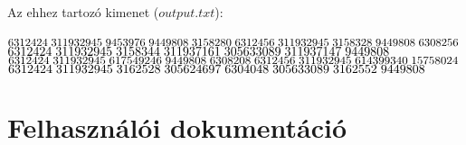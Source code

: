 \documentclass[12pt]{article}
\begin{document}
Az ehhez tartozó kimenet ($output.txt$):\\\\
$6312424\hspace{1mm} 311932945\hspace{1mm} 9453976\hspace{1mm} 9449808\hspace{1mm} 3158280\hspace{1mm} 6312456\hspace{1mm} 311932945\hspace{1mm} 3158328\hspace{1mm} 9449808\hspace{1mm} 6308256\hspace{1mm}$\\
$6312424\hspace{1mm} 311932945\hspace{1mm} 3158344\hspace{1mm} 311937161\hspace{1mm} 305633089\hspace{1mm} 311937147\hspace{1mm} 9449808\hspace{1mm}$\\
$6312424\hspace{1mm} 311932945\hspace{1mm} 617549246\hspace{1mm} 9449808\hspace{1mm} 6308208\hspace{1mm} 6312456\hspace{1mm} 311932945\hspace{1mm} 614399340\hspace{1mm} 15758024\hspace{1mm}$\\
$6312424\hspace{1mm} 311932945\hspace{1mm} 3162528\hspace{1mm} 305624697\hspace{1mm} 6304048\hspace{1mm} 305633089\hspace{1mm} 3162552\hspace{1mm} 9449808\hspace{1mm}$

\section{Felhasználói dokumentáció}
\end{document}
